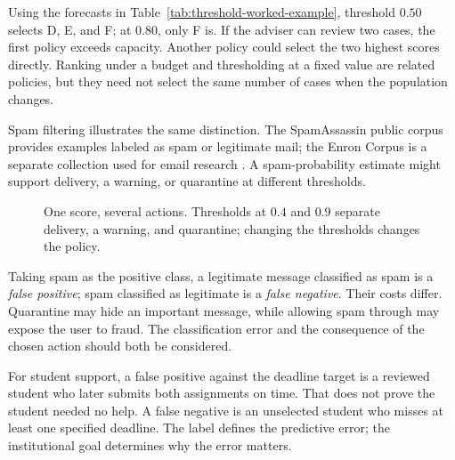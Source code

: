 Using the forecasts in Table~\ref{tab:threshold-worked-example}, threshold $0.50$ selects D, E, and F; at $0.80$, only F is. If the adviser can review two cases, the first policy exceeds capacity. Another policy could select the two highest scores directly. Ranking under a budget and thresholding at a fixed value are related policies, but they need not select the same number of cases when the population changes.

Spam filtering illustrates the same distinction. The SpamAssassin public corpus provides examples labeled as spam or legitimate mail; the Enron Corpus is a separate collection used for email research \citep{spamassassin,klimt2004}. A spam-probability estimate might support delivery, a warning, or quarantine at different thresholds.

\begin{figure}[t]
\centering
{}
\caption{One score, several actions. Thresholds at $0.4$ and $0.9$ separate delivery, a warning, and quarantine; changing the thresholds changes the policy.}
\label{fig:spam-thresholds}
\end{figure}

Taking spam as the positive class, a legitimate message classified as spam is a \emph{false positive}; spam classified as legitimate is a \emph{false negative}. Their costs differ. Quarantine may hide an important message, while allowing spam through may expose the user to fraud. The classification error and the consequence of the chosen action should both be considered.

For student support, a false positive against the deadline target is a reviewed student who later submits both assignments on time. That does not prove the student needed no help. A false negative is an unselected student who misses at least one specified deadline. The label defines the predictive error; the institutional goal determines why the error matters.

